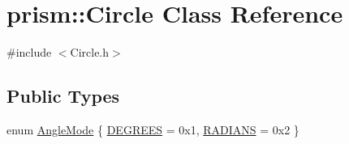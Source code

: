 \hypertarget{classprism_1_1_circle}{}\section{prism\+:\+:Circle Class Reference}
\label{classprism_1_1_circle}


{\ttfamily \#include $<$Circle.\+h$>$}

\subsection*{Public Types}
\begin{DoxyCompactItemize}
\item 
enum \hyperlink{classprism_1_1_circle_a74c7c532b4eb120b9227b7fabeffe6ac}{Angle\+Mode} \{ \hyperlink{classprism_1_1_circle_a74c7c532b4eb120b9227b7fabeffe6aca38d734252b9b86d558359698434cf5d4}{D\+E\+G\+R\+E\+ES} = 0x1, 
\hyperlink{classprism_1_1_circle_a74c7c532b4eb120b9227b7fabeffe6aca4e738ac91c0d446d1cd6c0ee11a7baaf}{R\+A\+D\+I\+A\+NS} = 0x2
 \}
\end{DoxyCompactItemize}
